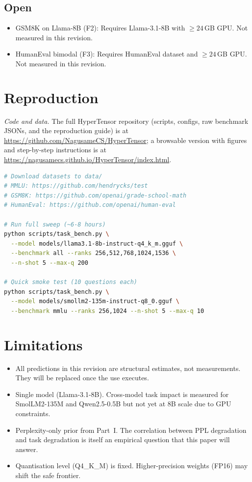 \documentclass[11pt]{article}
\begin{document}
\subsection{Open}
\begin{itemize}
\item GSM8K on Llama-8B (F2): Requires Llama-3.1-8B with
      $\ge 24$\,GB GPU.  Not measured in this revision.
\item HumanEval bimodal (F3): Requires HumanEval dataset
      and $\ge 24$\,GB GPU.  Not measured in this revision.
\end{itemize}

\section{Reproduction}
\smallskip\noindent\textit{Code and data.} The full HyperTensor repository (scripts, configs, raw benchmark JSONs, and the reproduction guide) is at \url{https://github.com/NagusameCS/HyperTensor}; a browsable version with figures and step-by-step instructions is at \url{https://nagusamecs.github.io/HyperTensor/index.html}.

\label{sec:repro}

\begin{lstlisting}[language=bash]
# Download datasets to data/
# MMLU: https://github.com/hendrycks/test
# GSM8K: https://github.com/openai/grade-school-math
# HumanEval: https://github.com/openai/human-eval

# Run full sweep (~6-8 hours)
python scripts/task_bench.py \
  --model models/llama3.1-8b-instruct-q4_k_m.gguf \
  --benchmark all --ranks 256,512,768,1024,1536 \
  --n-shot 5 --max-q 200

# Quick smoke test (10 questions each)
python scripts/task_bench.py \
  --model models/smollm2-135m-instruct-q8_0.gguf \
  --benchmark mmlu --ranks 256,1024 --n-shot 5 --max-q 10
\end{lstlisting}

\section{Limitations}
\label{sec:limits}

\begin{itemize}
\item All predictions in this revision are structural estimates, not
      measurements.  They will be replaced once the use executes.
\item Single model (Llama-3.1-8B).  Cross-model task impact is
      measured for SmolLM2-135M and Qwen2.5-0.5B but not yet at 8B
      scale due to GPU constraints.
\item Perplexity-only prior from Part~I.  The correlation between PPL
      degradation and task degradation is itself an empirical question
      that this paper will answer.
\item Quantisation level (Q4\_K\_M) is fixed.  Higher-precision weights
      (FP16) may shift the safe frontier.
\end{itemize}
\end{document}
